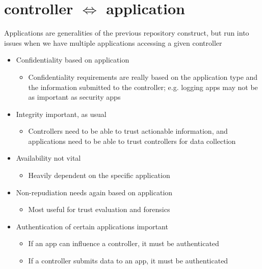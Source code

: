 \documentclass[12pt,letterpaper]{article}
\begin{document}
\newpage
\section{controller $\Longleftrightarrow$ application}
Applications are generalities of the previous repository construct, but run into issues when we have multiple applications accessing a given controller
\begin{itemize}
\item {\color{orange} Confidentiality based on application}
	\begin{itemize}
	\item Confidentiality requirements are really based on the application type and the information submitted to the controller; e.g. logging apps may not be as important as security apps
	\end{itemize}
\item {\color{red} Integrity important, as usual}
	\begin{itemize}
	\item Controllers need to be able to trust actionable information, and applications need to be able to trust controllers for data collection
	\end{itemize}
\item {\color{green} Availability not vital} 
	\begin{itemize}
	\item Heavily dependent on the specific application
	\end{itemize}
\item {\color{green} Non-repudiation needs again based on application}
	\begin{itemize}
	\item Most useful for trust evaluation and forensics
	\end{itemize}
\item {\color{red} Authentication of certain applications important}
	\begin{itemize}
	\item If an app can influence a controller, it must be authenticated
	\item If a controller submits data to an app, it must be authenticated
	\end{itemize}
\end{itemize}
\end{document}

